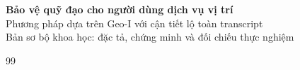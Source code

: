 \documentclass[10pt,a4paper]{article}
\begin{document}
{\setlength{\parskip}{0pt}\tableofcontents}
\clearpage
{}
\begin{center}
{\LARGE\bfseries\color{ink}Bảo vệ quỹ đạo cho người dùng dịch vụ vị trí}\\[4pt]
{\large Phương pháp dựa trên Geo-I với cận tiết lộ toàn transcript}\\[3pt]
{\small Bản sơ bộ khoa học: đặc tả, chứng minh và đối chiếu thực nghiệm}
\end{center}

\clearpage

\clearpage


\clearpage

\clearpage

\begin{small}\begin{thebibliography}{99}

\end{thebibliography}\end{small}
\clearpage

\end{document}

